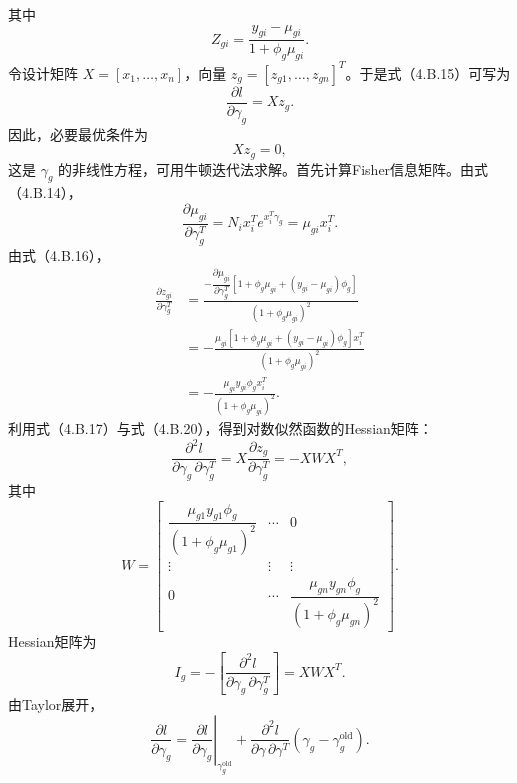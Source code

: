 其中
\begin{equation}
Z_{gi}=\frac{y_{gi}-\mu_{gi}}{1+\phi_g\mu_{gi}}.\tag{4.B.16}
\end{equation}
令设计矩阵 $X=[x_1,\ldots,x_n]$，向量 $z_g=[z_{g1},\ldots,z_{gn}]^T$。于是式（4.B.15）可写为
\begin{equation}
\frac{\partial l}{\partial\gamma_g}=Xz_g.\tag{4.B.17}
\end{equation}
因此，必要最优条件为
\begin{equation}
Xz_g=0,\tag{4.B.18}
\end{equation}
这是 $\gamma_g$ 的非线性方程，可用牛顿迭代法求解。首先计算Fisher信息矩阵。由式（4.B.14），
\begin{equation}
\frac{\partial\mu_{gi}}{\partial\gamma_g^T}
=N_ix_i^Te^{x_i^T\gamma_g}=\mu_{gi}x_i^T.\tag{4.B.19}
\end{equation}
由式（4.B.16），
\begin{equation}
\begin{aligned}
\frac{\partial z_{gi}}{\partial\gamma_g^T}
&=\frac{-\dfrac{\partial\mu_{gi}}{\partial\gamma_g^T}
 [1+\phi_g\mu_{gi}+(y_{gi}-\mu_{gi})\phi_g]}{(1+\phi_g\mu_{gi})^2}\\
&=-\frac{\mu_{gi}[1+\phi_g\mu_{gi}+(y_{gi}-\mu_{gi})\phi_g]x_i^T}{(1+\phi_g\mu_{gi})^2}\\
&=-\frac{\mu_{gi}y_{gi}\phi_gx_i^T}{(1+\phi_g\mu_{gi})^2}.
\end{aligned}\tag{4.B.20}
\end{equation}
利用式（4.B.17）与式（4.B.20），得到对数似然函数的Hessian矩阵：
\begin{equation}
\frac{\partial^2l}{\partial\gamma_g\,\partial\gamma_g^T}
=X\frac{\partial z_g}{\partial\gamma_g^T}=-XWX^T,\tag{4.B.21}
\end{equation}
其中
\[
W=\begin{bmatrix}
\dfrac{\mu_{g1}y_{g1}\phi_g}{(1+\phi_g\mu_{g1})^2}&\cdots&0\\
\vdots&\vdots&\vdots\\
0&\cdots&\dfrac{\mu_{gn}y_{gn}\phi_g}{(1+\phi_g\mu_{gn})^2}
\end{bmatrix}.
\]
Hessian矩阵为
\begin{equation}
I_g=-\left[\frac{\partial^2l}{\partial\gamma_g\,\partial\gamma_g^T}\right]=XWX^T.\tag{4.B.22}
\end{equation}
由Taylor展开，
\begin{equation}
\frac{\partial l}{\partial\gamma_g}
=\left.\frac{\partial l}{\partial\gamma_g}\right|_{\gamma_g^{\mathrm{old}}}
+\frac{\partial^2l}{\partial\gamma\,\partial\gamma^T}
(\gamma_g-\gamma_g^{\mathrm{old}}).\tag{4.B.23}
\end{equation}
